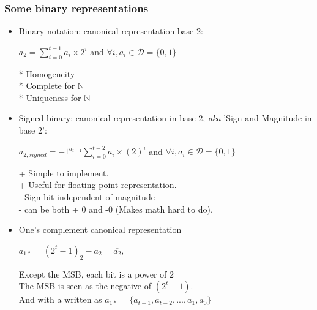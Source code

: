 \subsubsection{Some binary representations}
	\begin{itemize}	
		\item  Binary notation: canonical representation base 2:
		\begin{small}
			\begin{center}	
					$  a_{2}  =  \sum \limits_{i=0}^{t-1} a_i \times 2^i$ 
					and $\forall i, a_i \in \mathcal{D}= \{0,1\}$		
			\end{center}
		\end{small}	
			* Homogeneity\\
			* Complete for $\mathbb{N}$\\
			* Uniqueness for $\mathbb{N}$\\

		\item Signed binary: canonical representation in base $2$, \textit{aka} 'Sign and Magnitude in base $2$':
		\begin{small}
			\begin{center}	
					$  a_{2, signed} = {-1}^{a_{t-1}} \sum \limits_{i=0}^{t-2} a_i \times (2)^i$ 
					and $\forall i, a_i \in \mathcal{D}=\{ 0, 1\}$ 		
			\end{center}
		\end{small}
 		+ Simple to implement. \\ 
		+ Useful for floating point representation.  \\  
		- Sign bit independent of magnitude \\ 
		- can be  both + 0 and -0  (Makes math hard to do). \\  
		
		\item  One's complement canonical representation	
			\begin{center}	
				\begin{small}	
					$ a_{1*} = (2^{t}-1)_2-a_2 =\overline{ a_{2} }$,			
				\end{small}	
			\end{center}
			Except the MSB, each bit is a power of $2$\\
			The MSB is seen as the negative of $(2^{t}-1)$.\\
			And with a written as $ a_{1*} = \{a_{t-1}, a_{t-2}, ..., a_{1}, a_{0}  \} $ 
			\begin{center}	
				\begin{small}	


\end{small}
\end{center}
\end{itemize}

